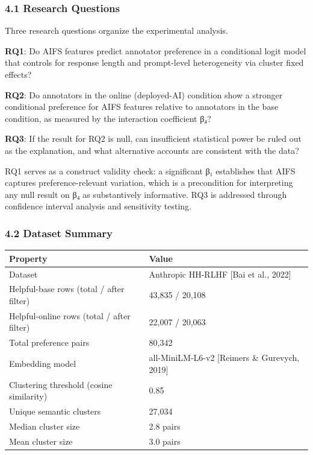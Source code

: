 
\subsubsection{4.1 Research Questions}

Three research questions organize the experimental analysis.

\textbf{RQ1}: Do AIFS features predict annotator preference in a conditional logit model that controls for response length and prompt-level heterogeneity via cluster fixed effects?

\textbf{RQ2}: Do annotators in the online (deployed-AI) condition show a stronger conditional preference for AIFS features relative to annotators in the base condition, as measured by the interaction coefficient β₄?

\textbf{RQ3}: If the result for RQ2 is null, can insufficient statistical power be ruled out as the explanation, and what alternative accounts are consistent with the data?

RQ1 serves as a construct validity check: a significant β₁ establishes that AIFS captures preference-relevant variation, which is a precondition for interpreting any null result on β₄ as substantively informative. RQ3 is addressed through confidence interval analysis and sensitivity testing.

\subsubsection{4.2 Dataset Summary}

\begin{table}[htbp]
\centering
\begin{tabular}{ll}
\toprule
Property & Value \\
\midrule
Dataset & Anthropic HH-RLHF [Bai et al., 2022] \\
Helpful-base rows (total / after filter) & 43,835 / 20,108 \\
Helpful-online rows (total / after filter) & 22,007 / 20,063 \\
Total preference pairs & 80,342 \\
Embedding model & all-MiniLM-L6-v2 [Reimers \& Gurevych, 2019] \\
Clustering threshold (cosine similarity) & 0.85 \\
Unique semantic clusters & 27,034 \\
Median cluster size & 2.8 pairs \\
Mean cluster size & 3.0 pairs \\
\bottomrule
\end{tabular}
\end{table}

